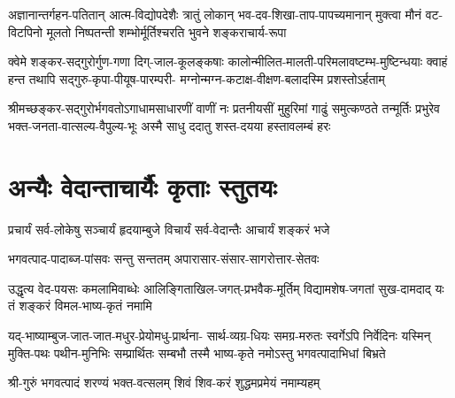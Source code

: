 
\fourlineindentedshloka
{अज्ञानान्तर्गहन-पतितान् आत्म-विद्योपदेशैः}
{त्रातुं लोकान् भव-दव-शिखा-ताप-पापच्यमानान्}
{मुक्त्वा मौनं वट-विटपिनो मूलतो निष्पतन्ती}
{शम्भोर्मूर्तिश्चरति भुवने शङ्कराचार्य-रूपा}


\fourlineindentedshloka
{क्वेमे शङ्कर-सद्गुरोर्गुण-गणा दिग्-जाल-कूलङ्कषाः}
{कालोन्मीलित-मालती-परिमलावष्टम्भ-मुष्टिन्धयाः}
{क्वाहं हन्त तथापि सद्गुरु-कृपा-पीयूष-पारम्परी-}
{मग्नोन्मग्न-कटाक्ष-वीक्षण-बलादस्मि प्रशस्तोऽर्हताम्}


\fourlineindentedshloka
{श्रीमच्छङ्कर-सद्गुरोर्भगवतोऽगाधामसाधारणीं}
{वाणीं नः प्रतनीयसीं मुहुरिमां गाढुं समुत्कण्ठते}
{तन्मूर्तिः प्रभुरेव भक्त-जनता-वात्सल्य-वैपुल्य-भूः}
{अस्मै साधु ददातु शस्त-दयया हस्तावलम्बं हरः}



\section{अन्यैः वेदान्ताचार्यैः कृताः स्तुतयः}

\twolineshloka
{प्रचार्यं सर्व-लोकेषु सञ्चार्यं हृदयाम्बुजे}
{विचार्यं सर्व-वेदान्तैः आचार्यं शङ्करं भजे}


\twolineshloka
{भगवत्पाद-पादाब्ज-पांसवः सन्तु सन्ततम्}
{अपारासार-संसार-सागरोत्तार-सेतवः}


\fourlineindentedshloka
{उद्धृत्य वेद-पयसः कमलामिवाब्धेः}
{आलिङ्गिताखिल-जगत्-प्रभवैक-मूर्तिम्}
{विद्यामशेष-जगतां सुख-दामदाद् यः}
{तं शङ्करं विमल-भाष्य-कृतं नमामि}


\fourlineindentedshloka
{यद्-भाष्याम्बुज-जात-जात-मधुर-प्रेयोमधु-प्रार्थना-}
{सार्थ-व्यग्र-धियः समग्र-मरुतः स्वर्गेऽपि निर्वेदिनः}
{यस्मिन् मुक्ति-पथः पथीन-मुनिभिः सम्प्रार्थितः सम्बभौ}
{तस्मै भाष्य-कृते नमोऽस्तु भगवत्पादाभिधां बिभ्रते}


\twolineshloka
{श्री-गुरुं भगवत्पादं शरण्यं भक्त-वत्सलम्}
{शिवं शिव-करं शुद्धमप्रमेयं नमाम्यहम्}

